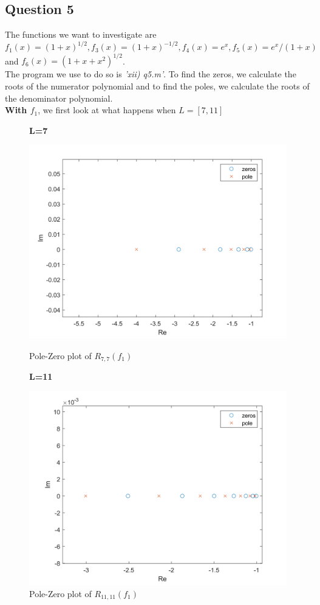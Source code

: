 \documentclass[10pt]{article}
\begin{document}
\subsection*{Question 5}
The functions we want to investigate are $f_1(x)=(1+x)^{1/2}, f_3(x)=(1+x)^{-1/2},f_4(x)=e^x,f_5(x)=e^x/(1+x)$ and $f_6(x)=(1+x+x^2)^{1/2}$.\\
The program we use to do so is \emph{'xii) q5.m'}. To find the zeros, we calculate the roots of the numerator polynomial and to find the poles, we calculate the roots of the denominator polynomial.\\
\textbf{With $f_1$}, we first look at what happens when $L=[7,11]$
\begin{figure}[H]
    \begin{minipage}[b]{0.47\linewidth}
            \centering
            \textbf{L=7}\par
            \includegraphics[width=\textwidth]{Files/q5,f1,7.png}
            \caption{Pole-Zero plot of $R_{7,7}(f_1)$}
        \end{minipage}
        \hfill
            \begin{minipage}[b]{0.47\linewidth}
            \centering
    \textbf{L=11}\par
    \includegraphics[width=\textwidth]{Files/q5,f1,11.png}
    \caption{Pole-Zero plot of $R_{11,11}(f_1)$}
        \end{minipage}
\end{figure}
\end{document}
